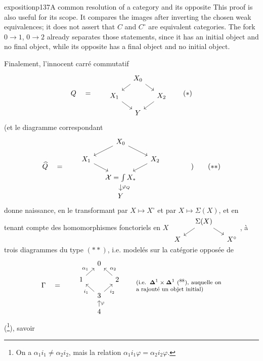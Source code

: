 \begin{dcomment}{exposition}{p137}{A common resolution of a category and its opposite}
This proof is also useful for its scope. It compares the images after inverting the chosen weak equivalences; it does not assert that $C$ and $C^\circ$ are equivalent categories. The fork $0\to1$, $0\to2$ already separates those statements, since it has an initial object and no final object, while its opposite has a final object and no initial object.
\end{dcomment}


Finalement, l'innocent carré commutatif
\[
Q \quad = \qquad
\begin{tikzcd}[row sep=small, column sep=small]
 & X_0 \arrow[dl] \arrow[dr] & \\
X_1 \arrow[dr] & & X_2 \arrow[dl] \\
 & Y &
\end{tikzcd}
\tag*{$(*)$}
\]
(et le diagramme correspondant
\[
\widehat{Q} \quad = \qquad
\begin{tikzcd}[row sep=small, column sep=small]
 & X_0 \arrow[dl] \arrow[dr] & \\
X_1 \arrow[dr] & & X_2 \arrow[dl] \\
 & \sX=\int X_* \arrow[d, "\varphi_Q"] & \\
 & Y &
\end{tikzcd}
\qquad\qquad )
\tag*{$(**)$}
\]
donne naissance, en le transformant
par $X\longmapsto X^\circ$ et par $X\longmapsto\Sigma(X)$, et en tenant compte des homomorphismes fonctoriels en $X$ $\begin{tikzcd}[row sep=small, column sep=small]
 & \Sigma(X) \arrow[dl] \arrow[dr] & \\
X & & X^\circ
\end{tikzcd}$, à trois diagrammes du type $(**)$, i.e. modelés sur la catégorie opposée de
\[
\Gamma \quad = \qquad
\begin{tikzcd}[row sep=small, column sep=small]
 & 0 & \\
1 \arrow[ur, "\alpha_1"] & & 2 \arrow[ul, "\alpha_2"'] \\
 & 3 \arrow[ul, "i_1"] \arrow[ur, "i_2"'] & \\
 & 4 \arrow[u, "\varphi"'] &
\end{tikzcd}
\qquad
\text{\parbox[c]{0.35\textwidth}{\footnotesize (i.e. $\boldsymbol{\Delta}^1\times\boldsymbol{\Delta}^1$ (\footnotemark[88]), auquelle on a rajouté un objet initial)}} %
\]
(\footnote[89]{On a $\alpha_1i_1\neq\alpha_2i_2$, mais la relation $\alpha_1i_1\varphi=\alpha_2i_2\varphi$.}), savoir
